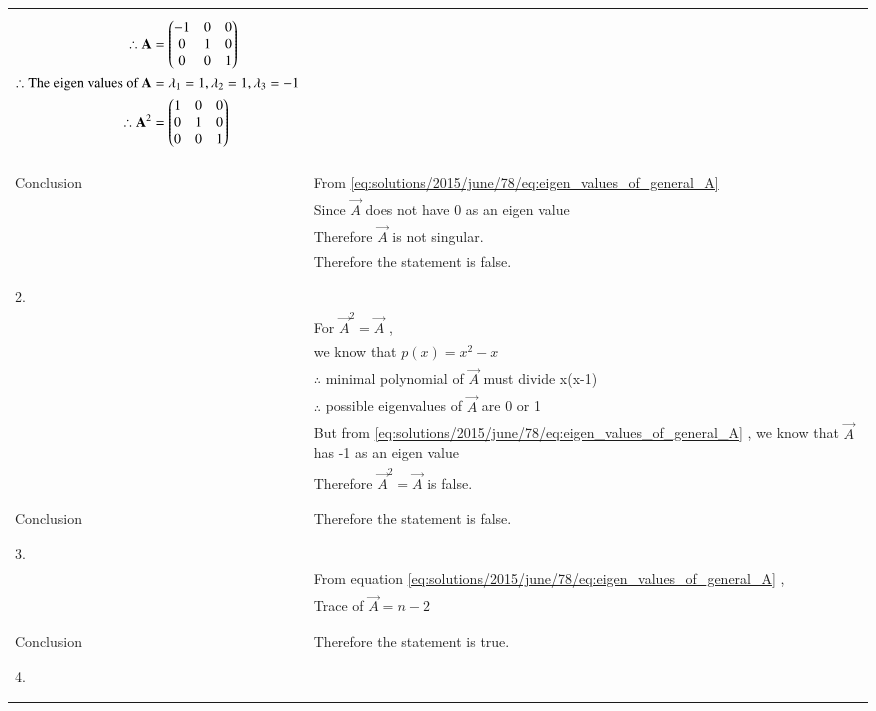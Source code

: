 \begin{longtable}{|l|l|}
{\begin{align}
    \therefore \mathbf{A}&=\begin{pmatrix}-1&0&0\\0&1&0\\0&0&1\end{pmatrix}\\
    \therefore \mbox{The eigen values of }\mathbf{A}&=\lambda_1=1,\lambda_2=1,\lambda_3=-1\\
    \therefore \mathbf{A}^2&=\begin{pmatrix}1&0&0\\0&1&0\\0&0&1\end{pmatrix}
\end{align}}\\
&\\
\hline
&\\
Conclusion&From \eqref{eq:solutions/2015/june/78/eq:eigen_values_of_general_A}\\
&Since $\vec{A}$ does not have 0 as an eigen value\\
&Therefore $\vec{A}$ is not singular.\\
&Therefore the statement is false.\\
&\\
\hline
&\\
2.&\\
& For $\vec{A}^2=\vec{A}$ ,\\
&we know that $p(x)=x^2-x$\\
&$\therefore$ minimal polynomial of $\vec{A}$ must divide x(x-1)\\
&$\therefore$ possible eigenvalues of $\vec{A}$ are 0 or 1\\
&But from \eqref{eq:solutions/2015/june/78/eq:eigen_values_of_general_A} , we know that $\vec{A}$ has -1 as an eigen value\\
&Therefore $\vec{A}^2=\vec{A}$ is false.\\
&\\
\hline
&\\
Conclusion&Therefore the statement is false.\\
&\\
\hline
&\\
3.&\\
& From equation \eqref{eq:solutions/2015/june/78/eq:eigen_values_of_general_A} ,\\
&Trace of $\vec{A}=n-2$\\
&\\
\hline
&\\
Conclusion&Therefore the statement is true.\\
&\\
\hline
&\\
4.&\\
&\parbox{8cm}{\begin{align*}

\end{align*}}
\end{longtable}
